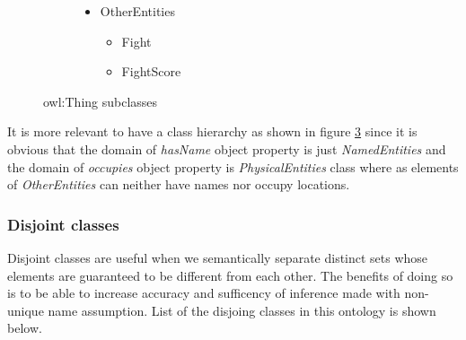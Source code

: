 \documentclass[a4paper]{article}
\begin{document}
\begin{figure}[H]
\begin{subfigure}{.3\textwidth}
	\vspace{1.5em}
	\label{fig:physical_entities}
\end{subfigure}%
\begin{subfigure}{.3\textwidth}
	\centering
	\begin{itemize}
		\item OtherEntities
		\begin{itemize}
			\item Fight
			\item FightScore
		\end{itemize}
	\end{itemize}
	\vspace{13em}
	\label{fig:other_entities}
\end{subfigure}
\caption{owl:Thing subclasses}
\label{fig:top_classes}
\end{figure}

It is more relevant to have a class hierarchy as shown in figure \ref{fig:top_classes} since it is obvious that the domain of \textit{hasName} object property is just \textit{NamedEntities} 
and the domain of \textit{occupies} object property is \textit{PhysicalEntities} class where as elements of \textit{OtherEntities} can neither have names nor occupy locations.

\subsubsection{Disjoint classes}
Disjoint classes are useful when we semantically separate distinct sets whose elements are guaranteed to be different from each other. The benefits of doing so is to be able to increase accuracy 
and sufficency of inference made with non-unique name assumption. List of the disjoing classes in this ontology is shown below.
\end{document}
